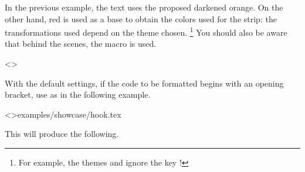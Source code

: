 \documentclass{tutodoc}
\begin{document}
\begin{tdocnote}
    In the previous example, the text uses the proposed darkened orange. On the other hand, red is used as a base to obtain the colors used for the strip: the transformations used depend on the theme chosen.%
    \footnote{
        For example, the themes  and  ignore the key !
    }
    You should also be aware that behind the scenes, the macro  is used.

    \begin{tdoclatex}<>
    \end{tdoclatex}
\end{tdocnote}




\begin{tdocwarn}
    With the default settings, if the code to be formatted begins with an opening bracket, use  as in the following example.

    \tdoclatexinput<>{examples/showcase/hook.tex}

    This will produce the following.
\end{tdocwarn}



\end{document}
